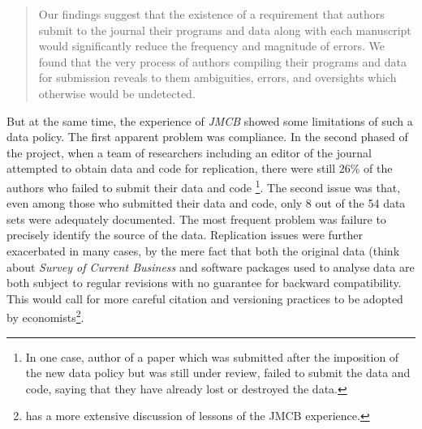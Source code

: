 \documentclass[11pt]{article}
\begin{document}
\begin{quotation}
Our findings suggest that the existence of a requirement that authors submit to the journal their programs and data along with each manuscript would significantly reduce the frequency and magnitude of errors. We found that the very process of authors compiling their programs and data for submission reveals to them ambiguities, errors, and oversights which otherwise would be undetected.
\end{quotation}

But at the same time, the experience of \textit{JMCB} showed some limitations of such a data policy. The first apparent problem was compliance. In the second phased of the project, when a team of researchers including an editor of the journal attempted to obtain data and code for replication, there were still 26\% of the authors who failed to submit their data and code \footnote{In one case, author of a paper which was submitted after the imposition of the new data policy but was still under review, failed to submit the data and code, saying that they have already lost or destroyed the data.}. The second issue was that, even among those who submitted their data and code, only 8 out of the 54 data sets were adequately documented. The most frequent problem was failure to precisely identify the source of the data. Replication issues were further exacerbated in many cases, by the mere fact that both the original data (think about \textit{Survey of Current Business} and software packages used to analyse data are both subject to regular revisions with no guarantee for backward compatibility. This would call for more careful citation and versioning practices to be adopted by economists\footnote{\cite{mccullough2006lessons} has a more extensive discussion of lessons of the JMCB experience.}.\\
\end{document}
